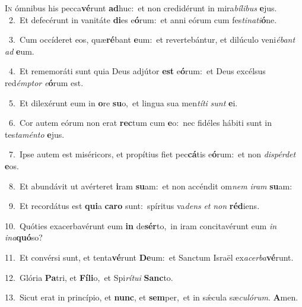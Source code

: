 \lettrine{\initial\textcolor{\initialcolor}{I}}{n} ómnibus his pecca\-\textbf{vé}\-runt \textbf{ad}\-huc:~\star et non credidérunt in mira\-\textit{bí}\-\textit{li}\textit{bus} \textbf{e}\-jus.\\
{\numbfont\textcolor{\numbcolor}{~2.}}~Et defecérunt in vanitáte \textbf{di}\-es e\-\textbf{ó}\-rum:~\star et anni eórum cum fes\-\textit{ti}\-\textit{na}\textit{ti}\textbf{ó}ne.\par
{\numbfont\textcolor{\numbcolor}{~3.}}~Cum occíderet eos, quæ\-\textbf{ré}\-bant \textbf{e}\-um:~\star et revertebántur, et dilúculo veni\-\textit{é}\-\textit{bant} \textit{ad} \textbf{e}\-um.\par
{\numbfont\textcolor{\numbcolor}{~4.}}~Et rememoráti sunt quia Deus adjútor \textbf{est} e\-\textbf{ó}\-rum:~\star et Deus excélsus red\-\textit{émp}\-\textit{tor} \textit{e}\-\textbf{ó}rum est.\par
{\numbfont\textcolor{\numbcolor}{~5.}}~Et dilexérunt eum in \textbf{o}\-re \textbf{su}\-o,~\star et lingua sua men\-\textit{tí}\-\textit{ti} \textit{sunt} \textbf{e}\-i.\par
{\numbfont\textcolor{\numbcolor}{~6.}}~Cor autem eórum non erat \textbf{rec}\-tum cum \textbf{e}\-o:~\star nec fidéles hábiti sunt in tes\-\textit{ta}\-\textit{mén}\textit{to} \textbf{e}\-jus.\par
{\numbfont\textcolor{\numbcolor}{~7.}}~Ipse autem est miséricors, et propítius fiet pec\-\textbf{cá}\-tis e\-\textbf{ó}\-rum:~\star et non \textit{dis}\-\textit{pér}\textit{det} \textbf{e}\-os.\par
{\numbfont\textcolor{\numbcolor}{~8.}}~Et abundávit ut avérteret \textbf{i}\-ram \textbf{su}\-am:~\star et non accéndit om\textit{nem} \textit{i}\-\textit{ram} \textbf{su}\-am:\par
{\numbfont\textcolor{\numbcolor}{~9.}}~Et recordátus est \textbf{qui}\-a \textbf{ca}\-\textbf{ro} sunt:~\star spíritus va\textit{dens} \textit{et} \textit{non} \textbf{réd}\-iens.\par
{\numbfont\textcolor{\numbcolor}{10.}}~Quóties exacerbavérunt eum \textbf{in} de\-\textbf{sér}\-to,~\star in iram concitavérunt eum \textit{in} \textit{in}\-\textit{a}\textbf{quó}so?\par
{\numbfont\textcolor{\numbcolor}{11.}}~Et convérsi sunt, et tenta\-\textbf{vé}\-runt \textbf{De}\-um:~\star et Sanctum Israël ex\-\textit{a}\-\textit{cer}\textit{ba}\textbf{vé}runt.\par
{\numbfont\textcolor{\numbcolor}{12.}}~Glória \textbf{Pa}\-tri, et \textbf{Fí}\-\textbf{li}o,~\star et Spi\-\textit{rí}\-\textit{tu}\textit{i} \textbf{Sanc}\-to.\par
{\numbfont\textcolor{\numbcolor}{13.}}~Sicut erat in princípio, et \textbf{nunc}\-, et \textbf{sem}\-per,~\star et in sǽcula sæ\-\textit{cu}\-\textit{ló}\textit{rum}. \textbf{A}\-men.\par
